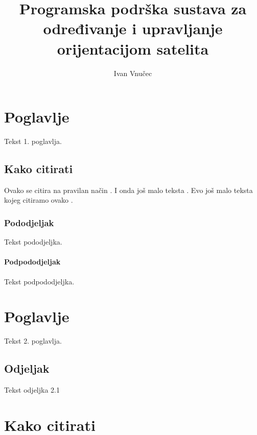 \documentclass[times, utf8, diplomski, numeric]{templates/template}
\begin{document}

\title{Programska podrška sustava za određivanje i upravljanje orijentacijom satelita}


\author{Ivan Vnučec}

\maketitle

\izvornik


\tableofcontents

\chapter{Poglavlje}
Tekst 1. poglavlja.

\section{Kako citirati}
Ovako se citira na pravilan način \cite{oetiket2007lshort}. I onda još malo teksta \cite{downes2002shortams}. 
Evo još malo teksta kojeg citiramo ovako \cite{ungar2002uvod}.

\subsection{Pododjeljak}
Tekst pododjeljka.

\subsubsection{Podpododjeljak}
Tekst podpododjeljka.

\chapter{Poglavlje}
Tekst 2. poglavlja.

\section{Odjeljak}
Tekst odjeljka 2.1

\chapter{Kako citirati}
\end{document}
